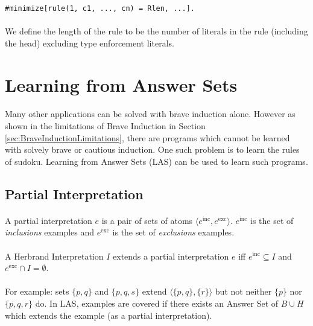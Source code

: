 \documentclass{article}
\theoremstyle{plain}
\theoremstyle{definition}
\begin{document}
\begin{multicols}{2}
\begin{lstlisting}
#minimize[rule(1, c1, ..., cn) = Rlen, ...].
\end{lstlisting}

\paragraph{} We define the length of the rule to be the number of literals in the rule (including the head) excluding type enforcement literals.

\section{Learning from Answer Sets}

\paragraph{} Many other applications can be solved with brave induction alone. However as shown in the limitations of Brave Induction in Section \ref{sec:BraveInductionLimitations}, there are programs which cannot be learned with solvely brave or cautious induction. One such problem is to learn the rules of sudoku. Learning from Answer Sets (LAS) can be used to learn such programs\cite{law14}.

\subsection{Partial Interpretation}

\paragraph{} A partial interpretation $e$ is a pair of sets of atoms $\langle e^\text{inc}, e^\text{exc}\rangle $. $e^\text{inc}$ is the set of \textit{inclusions} examples and $e^\text{exc}$ is the set of \textit{exclusions} examples.

\paragraph{} A Herbrand Interpretation $I$ extends a partial interpretation $e$ iff $e^\text{inc} \subseteq I$ and $e^\text{exc} \cap I = \emptyset$.

\paragraph{} For example: sets $\{p, q\}$ and $\{p, q, s\}$ extend $\langle \{p, q\}, \{r\} \rangle$ but not neither $\{p\}$ nor $\{p, q, r\}$ do. In LAS, examples are covered if there exists an Answer Set of $B \cup H$ which extends the example (as a partial interpretation).


\end{multicols}
\end{document}
